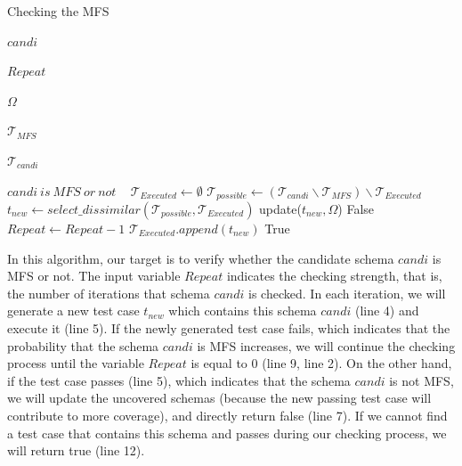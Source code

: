 \documentclass[journal,12pt,onecolumn,draftclsnofoot,]{IEEEtran}
\begin{document}
\begin{algorithm}
  \caption{Checking the MFS}
  \begin{algorithmic}[1]
     \Require


     $candi$ 


     $Repeat$  

     $\Omega$ 

     $\mathcal{T}_{MFS}$ 

     $\mathcal{T}_{candi}$ 


\Ensure  $candi\ is\ MFS\ or\ not $
\
       \State $\mathcal{T}_{Executed} \leftarrow \emptyset$
         \State $\mathcal{T}_{possible} \leftarrow (\mathcal{T}_{candi} \backslash \mathcal{T}_{MFS}) \backslash \mathcal{T}_{Executed} $
         \State $t_{new} \leftarrow select\_dissimilar(\mathcal{T}_{possible}, \mathcal{T}_{Executed})$
         \If {$execute(t_{new}$) == PASS}
          \State update($t_{new}, \Omega$)
          \State \Return   False
         \EndIf
         \State  $Repeat \leftarrow Repeat -1 $
         \State $\mathcal{T}_{Executed}.append(t_{new}) $
       \EndWhile
    \State \Return   True
  \end{algorithmic}
\end{algorithm}


In this algorithm, our target is to verify whether the candidate schema $candi$ is MFS or not. The input variable $Repeat$ indicates the checking strength, that is, the number of iterations that schema $candi$ is checked.  In each iteration, we will generate a new test case $t_{new}$ which contains this schema $candi$  (line 4) and execute it (line 5). If the newly generated test case fails, which indicates that the probability that the schema $candi$ is MFS increases, we will continue the checking process until the variable $Repeat$ is equal to 0 (line 9, line 2). On the other hand, if the test case passes (line 5), which indicates that the schema $candi$ is not MFS, we will update the uncovered schemas (because the new passing test case will contribute to more coverage), and directly return false (line 7). If we cannot find a test case that contains this schema and passes during our checking process, we will return true (line 12).
\end{document}
